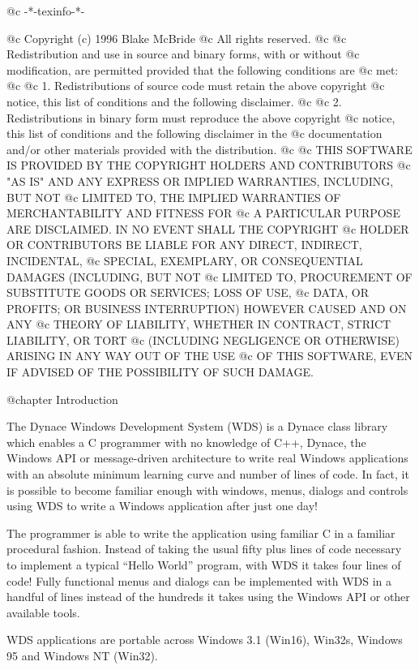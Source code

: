 @c -*-texinfo-*-

@c  Copyright (c) 1996 Blake McBride
@c  All rights reserved.
@c
@c  Redistribution and use in source and binary forms, with or without
@c  modification, are permitted provided that the following conditions are
@c  met:
@c
@c  1. Redistributions of source code must retain the above copyright
@c  notice, this list of conditions and the following disclaimer.
@c
@c  2. Redistributions in binary form must reproduce the above copyright
@c  notice, this list of conditions and the following disclaimer in the
@c  documentation and/or other materials provided with the distribution.
@c
@c  THIS SOFTWARE IS PROVIDED BY THE COPYRIGHT HOLDERS AND CONTRIBUTORS
@c  "AS IS" AND ANY EXPRESS OR IMPLIED WARRANTIES, INCLUDING, BUT NOT
@c  LIMITED TO, THE IMPLIED WARRANTIES OF MERCHANTABILITY AND FITNESS FOR
@c  A PARTICULAR PURPOSE ARE DISCLAIMED. IN NO EVENT SHALL THE COPYRIGHT
@c  HOLDER OR CONTRIBUTORS BE LIABLE FOR ANY DIRECT, INDIRECT, INCIDENTAL,
@c  SPECIAL, EXEMPLARY, OR CONSEQUENTIAL DAMAGES (INCLUDING, BUT NOT
@c  LIMITED TO, PROCUREMENT OF SUBSTITUTE GOODS OR SERVICES; LOSS OF USE,
@c  DATA, OR PROFITS; OR BUSINESS INTERRUPTION) HOWEVER CAUSED AND ON ANY
@c  THEORY OF LIABILITY, WHETHER IN CONTRACT, STRICT LIABILITY, OR TORT
@c  (INCLUDING NEGLIGENCE OR OTHERWISE) ARISING IN ANY WAY OUT OF THE USE
@c  OF THIS SOFTWARE, EVEN IF ADVISED OF THE POSSIBILITY OF SUCH DAMAGE.

@chapter Introduction

The Dynace Windows Development System (WDS) is a Dynace class library
which enables a C programmer with no knowledge of C++, Dynace, the
Windows API or message-driven architecture to write real Windows
applications with an absolute minimum learning curve and number of
lines of code.  In fact, it is possible to become familiar enough with
windows, menus, dialogs and controls using WDS to write a Windows
application after just one day!

The programmer is able to write the application using familiar C in a
familiar procedural fashion.  Instead of taking the usual fifty plus
lines of code necessary to implement a typical ``Hello World'' program,
with WDS it takes four lines of code!  Fully functional menus and
dialogs can be implemented with WDS in a handful of lines instead of the
hundreds it takes using the Windows API or other available tools.

WDS applications are portable across Windows 3.1 (Win16), Win32s,
Windows 95 and Windows NT (Win32).

